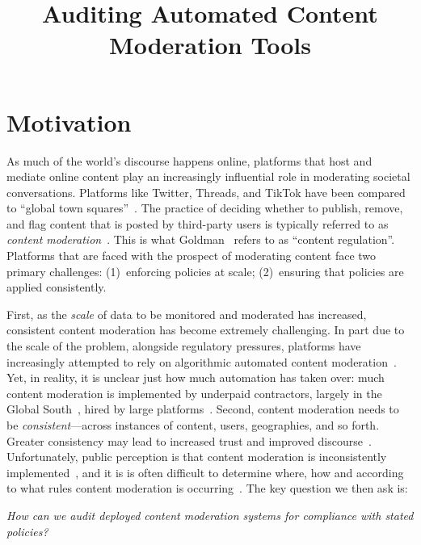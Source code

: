 \documentclass{article}
\title{Auditing Automated Content Moderation Tools}
\author{\vspace{-5ex}}
\date{\vspace{-5ex}}
\begin{document}
\maketitle

\section*{Motivation}
As much of the world's discourse happens online, platforms that host and mediate
online content play an increasingly influential role in moderating societal
conversations. Platforms like Twitter, Threads, and TikTok have been compared to
``global town squares''~\cite{tiktok_replace_twitter}. The practice of deciding
whether to publish, remove, and flag content that is posted by third-party users
is typically referred to as {\em content
moderation}~\cite{kiesler2011regulating,keller2020facts}. This is what
Goldman~\cite{goldman2021content} refers to as ``content regulation''. Platforms
that are faced with the prospect of moderating content face two primary
challenges: (1)~enforcing policies at scale; (2)~ensuring that policies are
applied consistently. 

First, as the {\em scale} of data to be monitored and moderated has increased,
consistent content moderation has become extremely challenging. In part due to
the scale of the problem, alongside regulatory pressures, platforms have
increasingly attempted to rely on algorithmic automated content
moderation~\cite{gorwa2020algorithmic}. Yet, in reality, it is unclear just how
much automation has taken over: much content moderation is implemented by
underpaid contractors, largely in the Global South~\cite{facebook_content_mod},
hired by large platforms~\cite{meta_content_mod}. Second, content moderation
needs to be \emph{consistent}---across instances of content,
users, geographies, and so forth. Greater consistency may lead to increased
trust and improved discourse~\cite{kiesler2011regulating}. Unfortunately, public
perception is that content moderation is inconsistently
implemented~\cite{sabin23,ozanne2022shall}, and it is
is often difficult to determine where, how and according to what rules content
moderation is occurring~\cite{keller2020facts}. The key question we then ask is:

\begin{center}
    \emph{How can we audit deployed content moderation systems for compliance with stated policies?}
\end{center}
\end{document}

